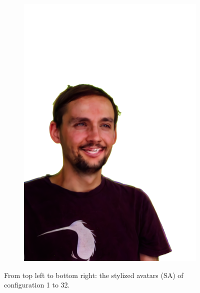 \begin{figure}[ht]
\begin{subfigure}{0.08\linewidth}
        \includegraphics[width=\textwidth]{Figures/results/low/simon_smile/11_render.png}
	\end{subfigure}
    \caption{From top left to bottom right: the stylized avatars (SA) of configuration 1 to 32.}
    \label{fig:all_stylized_results_low}
\end{figure}

